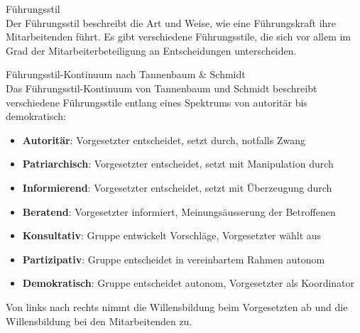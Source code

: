 \begin{definition}{Führungsstil}\\
Der Führungsstil beschreibt die Art und Weise, wie eine Führungskraft ihre Mitarbeitenden führt. Es gibt verschiedene Führungsstile, die sich vor allem im Grad der Mitarbeiterbeteiligung an Entscheidungen unterscheiden.
\end{definition}

\begin{concept}{Führungsstil-Kontinuum nach Tannenbaum \& Schmidt}\\
Das Führungsstil-Kontinuum von Tannenbaum und Schmidt beschreibt verschiedene Führungsstile entlang eines Spektrums von autoritär bis demokratisch:
\begin{itemize}
    \item \textbf{Autoritär}: Vorgesetzter entscheidet, setzt durch, notfalls Zwang
    \item \textbf{Patriarchisch}: Vorgesetzter entscheidet, setzt mit Manipulation durch
    \item \textbf{Informierend}: Vorgesetzter entscheidet, setzt mit Überzeugung durch
    \item \textbf{Beratend}: Vorgesetzter informiert, Meinungsäusserung der Betroffenen
    \item \textbf{Konsultativ}: Gruppe entwickelt Vorschläge, Vorgesetzter wählt aus
    \item \textbf{Partizipativ}: Gruppe entscheidet in vereinbartem Rahmen autonom
    \item \textbf{Demokratisch}: Gruppe entscheidet autonom, Vorgesetzter als Koordinator
\end{itemize}

Von links nach rechts nimmt die Willensbildung beim Vorgesetzten ab und die Willensbildung bei den Mitarbeitenden zu.
\end{concept}

